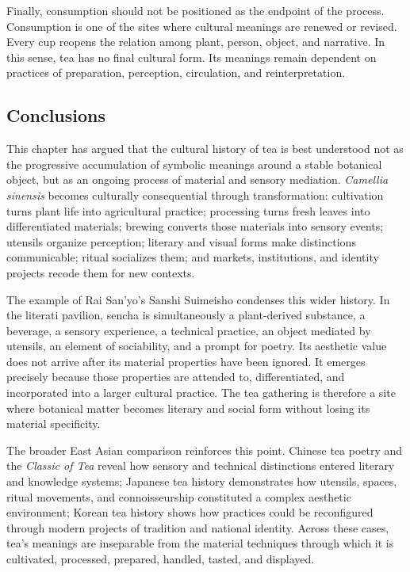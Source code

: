 \documentclass[numbers]{IntechOpen-Book}
\begin{document}
Finally, consumption should not be positioned as the endpoint of the process. Consumption is one of the sites where cultural meanings are renewed or revised. Every cup reopens the relation among plant, person, object, and narrative. In this sense, tea has no final cultural form. Its meanings remain dependent on practices of preparation, perception, circulation, and reinterpretation.

\begin{backmatter}
\section{Conclusions}

This chapter has argued that the cultural history of tea is best understood not as the progressive accumulation of symbolic meanings around a stable botanical object, but as an ongoing process of material and sensory mediation. \textit{Camellia sinensis} becomes culturally consequential through transformation: cultivation turns plant life into agricultural practice; processing turns fresh leaves into differentiated materials; brewing converts those materials into sensory events; utensils organize perception; literary and visual forms make distinctions communicable; ritual socializes them; and markets, institutions, and identity projects recode them for new contexts.

The example of Rai San'yo's Sanshi Suimeisho condenses this wider history. In the literati pavilion, sencha is simultaneously a plant-derived substance, a beverage, a sensory experience, a technical practice, an object mediated by utensils, an element of sociability, and a prompt for poetry. Its aesthetic value does not arrive after its material properties have been ignored. It emerges precisely because those properties are attended to, differentiated, and incorporated into a larger cultural practice. The tea gathering is therefore a site where botanical matter becomes literary and social form without losing its material specificity.

The broader East Asian comparison reinforces this point. Chinese tea poetry and the \textit{Classic of Tea} reveal how sensory and technical distinctions entered literary and knowledge systems; Japanese tea history demonstrates how utensils, spaces, ritual movements, and connoisseurship constituted a complex aesthetic environment; Korean tea history shows how practices could be reconfigured through modern projects of tradition and national identity. Across these cases, tea's meanings are inseparable from the material techniques through which it is cultivated, processed, prepared, handled, tasted, and displayed.


\end{backmatter}
\end{document}
